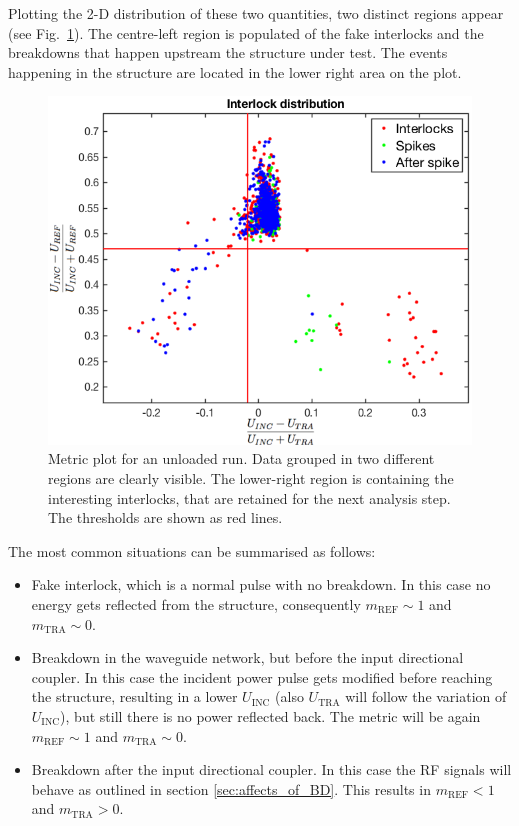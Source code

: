 Plotting the 2-D distribution of these two quantities, two distinct regions appear (see Fig.~\ref{Metric_plot}). The centre-left region is populated of the fake interlocks and the breakdowns that happen upstream the structure under test. The events happening in the structure are located in the lower right area on the plot. 

\begin{figure}[h]
\centering 
\includegraphics[scale=0.46]{pictures/metric_plt.png}
\caption{Metric plot for an unloaded run. Data grouped in two different regions are clearly visible. The lower-right region is containing the interesting interlocks, that are retained for the next analysis step. The thresholds are shown as red lines.}
\label{Metric_plot}
\end{figure}


The most common situations can be summarised as follows:
\begin{itemize}
\item Fake interlock, which is a normal pulse with no breakdown. In this case no energy gets reflected from the structure, consequently $m_\text{REF} \sim 1$ and  $m_\text{TRA} \sim 0$.
\item Breakdown in the waveguide network, but before the input directional coupler. In this case the incident power pulse gets modified before reaching the structure, resulting in a lower $U_\text{INC}$ (also $U_\text{TRA}$ will follow the variation of $U_\text{INC}$), but still there is no power reflected back. The metric will be again $m_\text{REF} \sim 1$ and  $m_\text{TRA} \sim 0$.
\item Breakdown after the input directional coupler. In this case the RF signals will behave as outlined in section \ref{sec:affects_of_BD}. This results in $m_\text{REF} <1$ and  $m_\text{TRA} > 0$.
\end{itemize}

